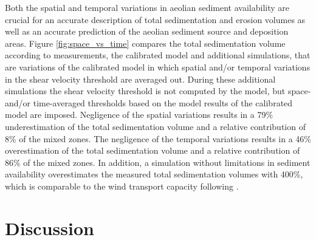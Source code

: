 Both the spatial and temporal variations in aeolian sediment
availability are crucial for an accurate description of total
sedimentation and erosion volumes as well as an accurate prediction of
the aeolian sediment source and deposition areas.  Figure
\ref{fig:space_vs_time} compares the total sedimentation volume
according to measurements, the calibrated model and additional
simulations, that are variations of the calibrated model in which
spatial and/or temporal variations in the shear velocity threshold are
averaged out. During these additional simulations the shear velocity
threshold is not computed by the model, but space- and/or
time-averaged thresholds based on the model results of the calibrated
model are imposed. Negligence of the spatial variations results in a
79\% underestimation of the total sedimentation volume and a relative
contribution of 8\% of the mixed zones. The negligence of the temporal
variations results in a 46\% overestimation of the total sedimentation
volume and a relative contribution of 86\% of the mixed zones.  In
addition, a simulation without limitations in sediment availability
overestimates the measured total sedimentation volumes with 400\%,
which is comparable to the wind transport capacity following
\citet[][Figure \ref{fig:models}]{Bagnold1937a}.






%

\section{Discussion}

